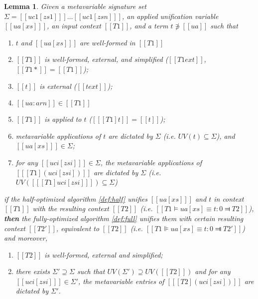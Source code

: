 \documentclass[a4,natbib=false]{article}
\newcommand{\niton}{\not\owns}
\newtheorem{lemma}{Lemma}
\begin{document}
\begin{lemma}
  Given a metavariable signature set  $\Sigma = [[ uc1[zs1] ]] \dots [[uc1[zsn] ]]$,
  an applied unification variable $[[ ua[xs] ]]$, an input context $[[ T1 ]]$,
  and a term $t \niton [[ua]]$ such that
  \begin{enumerate}
  \item $t$ and $[[ ua[xs] ]]$ are well-formed in $[[T1]]$
  \item $[[T1]]$  is well-formed, external, and simplified ($ [[T1 ext]] $,  $[[T1*]] = [[T1]]$);
  \item $[[t]]$ is external ($[[t ext]]$);
  \item $[[ua : arn]] \in [[T1]]$
  \item $ [[T1]] $ is applied to $t$ ($[[ [T1] t ]] = [[t]]$);
  \item metavariable applications of $t$ are dictated by $\Sigma$
    (i.e. $UV(t) \subseteq \Sigma$), and $[[ ua[xs] ]] \in \Sigma$;
  \item for any $ [[ uci[zsi] ]] \in \Sigma $, the metavariable applications of
    $ [[ [T1](uci[zsi]) ]] $ are dictated by $\Sigma$
    (i.e. $UV([[ [T1]uci[zsi] ]]) \subseteq \Sigma$)
  \end{enumerate}
  if the half-optimized algorithm \ref{def:half} unifies $[[ ua[xs] ]]$ and
  $t$ in context $[[ T1 ]]$ with the resulting context $[[ T2 ]]$
  (i.e. $[[T1 ⊨ ua[xs] ≡ t : 0 ⫤ T2]]$),
  \textbf{then} the fully-optimized algorithm \ref{def:full}
  unifies them with certain resulting context $[[ T2' ]]$, equivalent to $[[ T2 ]]$
  (i.e. $[[T1 ⊫ ua[xs] ≡ t : 0 ⫥ T2']]$) and moreover,
  \begin{enumerate}
    \item $ [[ T2 ]] $ is well-formed, external and simplified;
    \item there exists $\Sigma' \supseteq \Sigma$ such that 
      $UV(\Sigma') \supseteq UV( [[ T2 ]] )$ and
      for any $ [[ uci[zsi] ]] \in \Sigma' $, the metavariable entries of 
      $ [[ [T2](uci[zsi]) ]] $ are dictated by $\Sigma'$.
  \end{enumerate}
\end{lemma}
\end{document}
